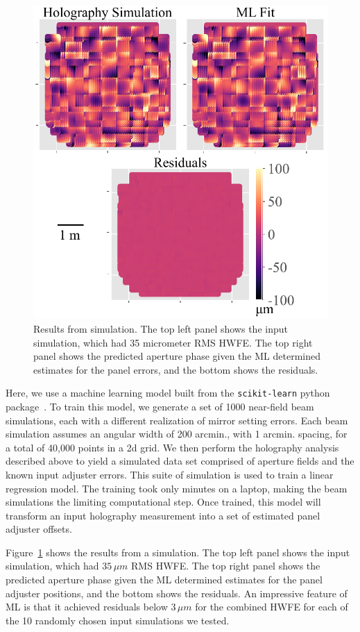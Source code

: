 \begin{figure}[t]
    \centering
    \includegraphics[width=.7\textwidth]{Figures/ap_length_corrected_single_pannel3-compressed.pdf}
    \caption{Results from simulation.  The top left panel shows the input simulation, which had 35 micrometer RMS HWFE.  The top right panel shows the predicted aperture phase given the ML determined estimates for the panel errors, and the bottom shows the residuals.}
    \label{fig:ap_resids}
\end{figure}
Here, we use a machine learning model built from the \verb|scikit-learn| python package~\cite{scikit}. To train this model, we generate a set of 1000 near-field beam simulations, each with a different realization of mirror setting errors.  Each beam simulation assumes an angular width of 200 arcmin., with 1 arcmin. spacing, for a total of 40,000 points in a 2d grid.  We then perform the holography analysis described above to yield a simulated data set comprised of aperture fields and the known input adjuster errors.  This suite of simulation is used to train a linear regression model.  The training took only minutes on a laptop, making the beam simulations the limiting computational step.  Once trained, this model will transform an input holography measurement into a set of estimated panel adjuster offsets.

Figure~\ref{fig:ap_resids} shows the results from a simulation.  The top left panel shows the input simulation, which had $35\,\mu m$ RMS HWFE.  The top right panel shows the predicted aperture phase given the ML determined estimates for the panel adjuster positions, and the bottom shows the residuals.  An impressive feature of ML is that it achieved residuals below $3\,\mu m$ for the combined HWFE for each of the 10 randomly chosen input simulations we tested.

